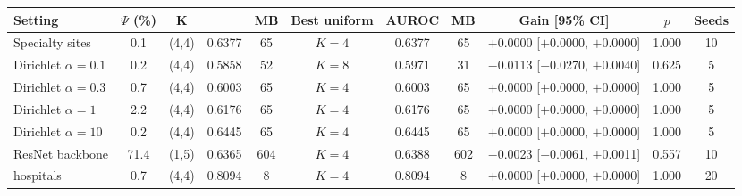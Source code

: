 \begin{tabular}{@{}lcccccccccc@{}}
\toprule
Setting & $\Psi$ (\%) & $\mathbf K$ & \tierfed{} & MB & Best uniform & AUROC & MB & Gain [95\% CI] & $p$ & Seeds\\
\midrule
Specialty sites & 0.1 & (4,4) & 0.6377 & 65 & $K=4$ & 0.6377 & 65 & \ensuremath{+}0.0000 [\ensuremath{+}0.0000, \ensuremath{+}0.0000] & 1.000 & 10\\
Dirichlet $\alpha=0.1$ & 0.2 & (4,4) & 0.5858 & 52 & $K=8$ & 0.5971 & 31 & \ensuremath{-}0.0113 [\ensuremath{-}0.0270, \ensuremath{+}0.0040] & 0.625 & 5\\
Dirichlet $\alpha=0.3$ & 0.7 & (4,4) & 0.6003 & 65 & $K=4$ & 0.6003 & 65 & \ensuremath{+}0.0000 [\ensuremath{+}0.0000, \ensuremath{+}0.0000] & 1.000 & 5\\
Dirichlet $\alpha=1$ & 2.2 & (4,4) & 0.6176 & 65 & $K=4$ & 0.6176 & 65 & \ensuremath{+}0.0000 [\ensuremath{+}0.0000, \ensuremath{+}0.0000] & 1.000 & 5\\
Dirichlet $\alpha=10$ & 0.2 & (4,4) & 0.6445 & 65 & $K=4$ & 0.6445 & 65 & \ensuremath{+}0.0000 [\ensuremath{+}0.0000, \ensuremath{+}0.0000] & 1.000 & 5\\
ResNet backbone & 71.4 & (1,5) & 0.6365 & 604 & $K=4$ & 0.6388 & 602 & \ensuremath{-}0.0023 [\ensuremath{-}0.0061, \ensuremath{+}0.0011] & 0.557 & 10\\
hospitals & 0.7 & (4,4) & 0.8094 & 8 & $K=4$ & 0.8094 & 8 & \ensuremath{+}0.0000 [\ensuremath{+}0.0000, \ensuremath{+}0.0000] & 1.000 & 20\\
\bottomrule
\end{tabular}
